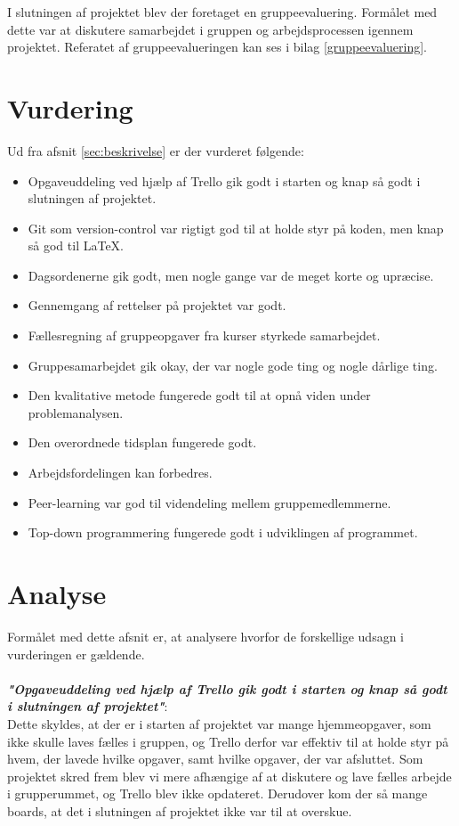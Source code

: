 \documentclass[oneside,a4paper,titlepage]{article}
\begin{document}
I slutningen af projektet blev der foretaget en gruppeevaluering. Formålet med dette var at diskutere samarbejdet i gruppen og arbejdsprocessen igennem projektet. Referatet af gruppeevalueringen kan ses i bilag \ref{gruppeevaluering}.

\section{Vurdering}
Ud fra afsnit \ref{sec:beskrivelse} er der vurderet følgende:
\begin{itemize}
  \item Opgaveuddeling ved hjælp af Trello gik godt i starten og knap så godt i slutningen af projektet.
  \item Git som version-control var rigtigt god til at holde styr på koden, men knap så god til LaTeX.
  \item Dagsordenerne gik godt, men nogle gange var de meget korte og upræcise.
  \item Gennemgang af rettelser på projektet var godt.
  \item Fællesregning af gruppeopgaver fra kurser styrkede samarbejdet.
  \item Gruppesamarbejdet gik okay, der var nogle gode ting og nogle dårlige ting. 
  \item Den kvalitative metode fungerede godt til at opnå viden under problemanalysen.
  \item Den overordnede tidsplan fungerede godt.
  \item Arbejdsfordelingen kan forbedres.
  \item Peer-learning var god til videndeling mellem gruppemedlemmerne.
  \item Top-down programmering fungerede godt i udviklingen af programmet.
\end{itemize}
\setlength\parindent{0pt}
\section{Analyse}
Formålet med dette afsnit er, at analysere hvorfor de forskellige udsagn i vurderingen er gældende.
 \\\\
\textbf{\textit{"Opgaveuddeling ved hjælp af Trello gik godt i starten og knap så godt i slutningen af projektet"}}: \\

Dette skyldes, at der er i starten af projektet var mange hjemmeopgaver, som ikke skulle laves fælles i gruppen, og Trello derfor var effektiv til at holde styr på hvem, der lavede hvilke opgaver, samt hvilke opgaver, der var afsluttet. Som projektet skred frem blev vi mere afhængige af at diskutere og lave fælles arbejde i grupperummet, og Trello blev ikke opdateret. Derudover kom der så mange boards, at det i slutningen af projektet ikke var til at overskue. \\
\end{document}
